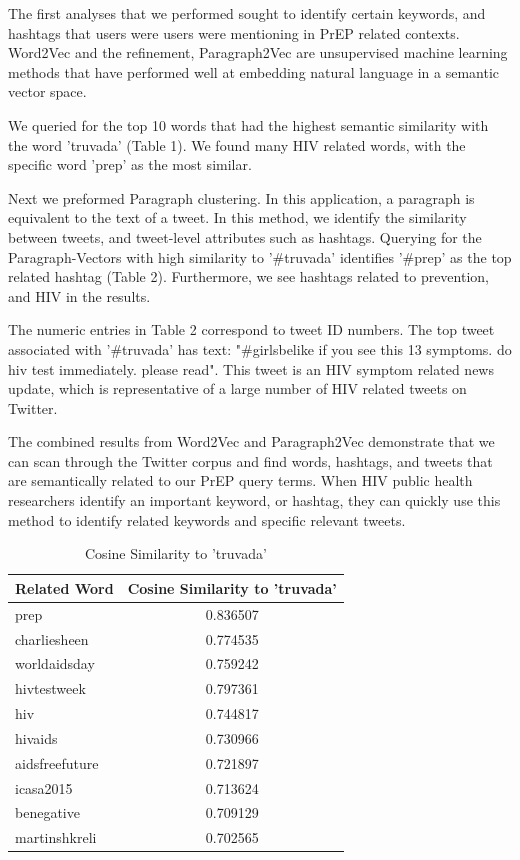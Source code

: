 \documentclass{sig-alternate-05-2015}
\begin{document}
The first analyses that we performed sought to identify certain keywords, and hashtags that users were users were mentioning in PrEP related contexts. Word2Vec and the refinement, Paragraph2Vec are unsupervised machine learning methods that have performed well at embedding natural language in a semantic vector space.

We queried for the top 10 words that had the highest semantic similarity with the word 'truvada' (Table 1). We found many HIV related words, with the specific word 'prep' as the most similar.

Next we preformed Paragraph clustering. In this application, a paragraph is equivalent to the text of a tweet. In this method, we identify the similarity between tweets, and tweet-level attributes such as hashtags. Querying for the Paragraph-Vectors with high similarity to '\#truvada' identifies '\#prep' as the top related hashtag (Table 2). Furthermore, we see hashtags related to prevention, and HIV in the results.

The numeric entries in Table 2 correspond to tweet ID numbers. The top tweet associated with '\#truvada' has text: "\#girlsbelike if you see this 13 symptoms. do hiv test immediately. please read". This tweet is an HIV symptom related news update, which is representative of a large number of HIV related tweets on Twitter.

The combined results from Word2Vec and Paragraph2Vec demonstrate that we can scan through the Twitter corpus and find words, hashtags, and tweets that are semantically related to our PrEP query terms. When HIV public health researchers identify an important keyword, or hashtag, they can quickly use this method to identify related keywords and specific relevant tweets.

\begin{table}
\centering
\caption{Cosine Similarity to 'truvada'}
\begin{tabular}{|l|c|} \hline
Related Word & Cosine Similarity to 'truvada'\\ \hline
prep & 0.836507\\ \hline
charliesheen & 0.774535\\ \hline
worldaidsday & 0.759242\\ \hline
hivtestweek & 0.797361\\ \hline
hiv & 0.744817\\ \hline
hivaids & 0.730966\\ \hline
aidsfreefuture & 0.721897\\ \hline
icasa2015 & 0.713624\\ \hline
benegative & 0.709129\\ \hline
martinshkreli & 0.702565\\ \hline
\hline\end{tabular}
\end{table}
\end{document}

